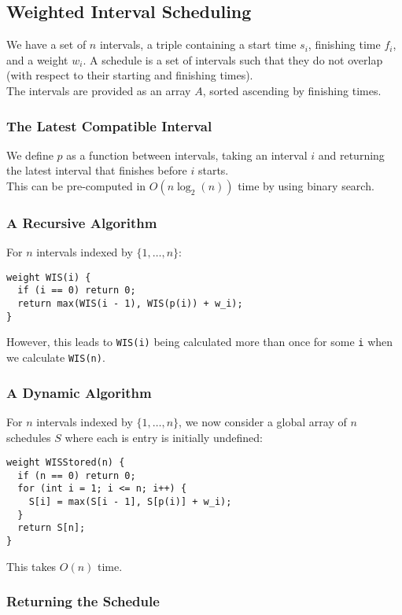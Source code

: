 \subsection{Weighted Interval Scheduling}

We have a set of $n$ intervals, a triple containing a
start time $s_i$, finishing time $f_i$, and a weight $w_i$.
A schedule is a set of intervals such that they do not overlap
(with respect to their starting and finishing times).
\\[\baselineskip]
The intervals are provided as an array $A$, sorted ascending by
finishing times.

\subsubsection{The Latest Compatible Interval}

We define $p$ as a function between intervals, taking an interval $i$ and 
returning the latest interval that finishes before $i$ starts.
\\[\baselineskip]
This can be pre-computed in $O(n\log_2(n))$ time by using binary search.

\subsubsection{A Recursive Algorithm}

For $n$ intervals indexed by $\{1, \ldots, n\}$: \begin{lstlisting}
weight WIS(i) {
  if (i == 0) return 0;
  return max(WIS(i - 1), WIS(p(i)) + w_i);
}
\end{lstlisting} However, this leads to \texttt{WIS(i)} being calculated more than once
for some \texttt{i} when we calculate \texttt{WIS(n)}.

\subsubsection{A Dynamic Algorithm}

For $n$ intervals indexed by $\{1, \ldots, n\}$, we now consider a global array 
of $n$ schedules $S$ where each is entry is initially undefined: \begin{lstlisting}
weight WISStored(n) {
  if (n == 0) return 0;
  for (int i = 1; i <= n; i++) {
    S[i] = max(S[i - 1], S[p(i)] + w_i);
  }
  return S[n];
}
\end{lstlisting} This takes $O(n)$ time.

\subsubsection{Returning the Schedule}


